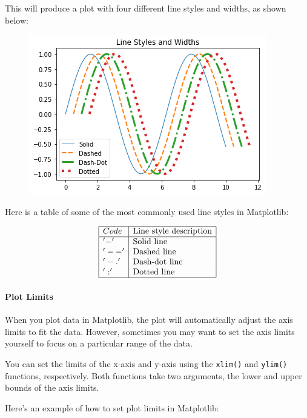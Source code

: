 \documentclass[11pt]{article}
\begin{document}
This will produce a plot with four different line styles and widths, as
shown below: 
\begin{figure}
  \centering
  \includegraphics[scale=0.6]{line_custom.png}
\end{figure}

Here is a table of some of the most commonly used line styles in
Matplotlib:

$$\begin{array}{|l|l|}
\hline
  Code & \text{Line style description}\\
\hline
'-' & \text{Solid line }\\
'--' & \text{Dashed line }\\
'-.' & \text{Dash-dot line }\\
':' & \text{Dotted line }\\
\hline
\end{array}
$$

\hypertarget{plot-limits}{%
\paragraph{Plot Limits}\label{plot-limits}}

When you plot data in Matplotlib, the plot will automatically adjust the
axis limits to fit the data. However, sometimes you may want to set the
axis limits yourself to focus on a particular range of the data.

You can set the limits of the x-axis and y-axis using the
\texttt{xlim()} and \texttt{ylim()} functions, respectively. Both
functions take two arguments, the lower and upper bounds of the axis
limits.

Here's an example of how to set plot limits in Matplotlib:
\end{document}
